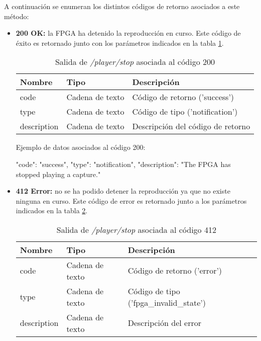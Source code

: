 A continuación se enumeran los distintos códigos de retorno asociados a este método:
\begin{itemize}

\item{\textbf{200 OK:} la \gls{FPGA} ha detenido la reproducción en curso. Este código de éxito es retornado junto con los parámetros indicados en la tabla \ref{extra:api:playerstop:ok}.
\begin{table}[H]
\centering
\begin{tabular}{|l|l|l|}
\hline
\rowcolor[HTML]{F5F5F5}
\textbf{Nombre}  & \textbf{Tipo}   & \textbf{Descripción}              \\ \hline
code             & Cadena de texto & Código de retorno ('success')     \\ \hline
type             & Cadena de texto & Código de tipo ('notification')   \\ \hline
description      & Cadena de texto & Descripción del código de retorno \\ \hline
\end{tabular}
\caption{Salida de \textit{/player/stop} asociada al código 200}
\label{extra:api:playerstop:ok}
\end{table}
\begin{minipage}{\textwidth}
Ejemplo de datos asociados al código 200:

\begin{code}[language=json]
{
  "code": "success",
  "type": "notification",
  "description": "The FPGA has stopped playing a capture."
}
\end{code}
\end{minipage}
}

\item{\textbf{412 Error:} no se ha podido detener la reproducción ya que no existe ninguna en curso. Este código de error es retornado junto a los parámetros indicados en la tabla \ref{extra:api:playerstop:error}.
\begin{table}[H]
\centering
\begin{tabular}{|l|l|l|}
\hline
\rowcolor[HTML]{F5F5F5}
\textbf{Nombre}  & \textbf{Tipo}   & \textbf{Descripción}                    \\ \hline
code             & Cadena de texto & Código de retorno ('error')             \\ \hline
type             & Cadena de texto & Código de tipo ('fpga\_invalid\_state') \\ \hline
description      & Cadena de texto & Descripción del error                   \\ \hline
\end{tabular}
\caption{Salida de \textit{/player/stop} asociada al código 412}
\label{extra:api:playerstop:error}
\end{table}

}
\end{itemize}

